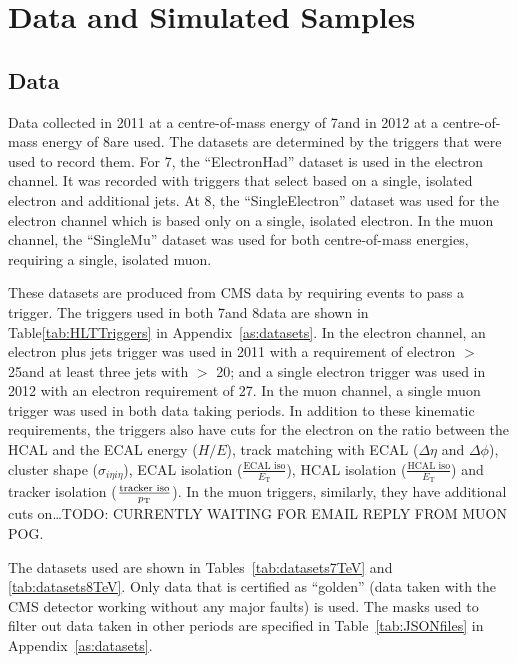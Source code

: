 \section{Data and Simulated Samples}
\label{s:data_and_simulated_samples}

\subsection{Data}
\label{ss:data}

Data collected in 2011 at a centre-of-mass energy of 7\TeV and in 2012 at a centre-of-mass energy of 8\TeV are
used. The datasets are determined by the triggers that were used to record them. For 7\TeV, the ``ElectronHad''
dataset is used in the electron channel. It was recorded with triggers that select based on a single, isolated
electron and additional jets. At 8\TeV, the ``SingleElectron'' dataset was used for the electron channel which is
based only on a single, isolated electron. In the muon channel, the ``SingleMu'' dataset was used for both
centre-of-mass energies, requiring a single, isolated muon.

These datasets are produced from CMS data by requiring events to pass a trigger. The triggers used in both
7\TeV and 8\TeV data are shown in Table\ref{tab:HLTTriggers} in Appendix~\ref{as:datasets}. In the electron
channel, an electron plus jets trigger was used in 2011 with a requirement of electron \Et $>$ 25\GeV and at
least three jets with \pt $>$ 20\GeV; and a single electron trigger was used in 2012 with an electron \Et
requirement of 27\GeV. In the muon channel, a single muon trigger was used in both data taking periods. In
addition to these kinematic requirements, the triggers also have cuts for the electron on the ratio between
the HCAL and the ECAL energy ($H/E$), track matching with ECAL ($\Delta\eta$ and $\Delta\phi$), cluster shape
($\sigma_{i\eta i\eta}$), ECAL isolation ($\frac{\text{ECAL iso}}{E_\text{T}}$), HCAL isolation
($\frac{\text{HCAL iso}}{E_\text{T}}$) and tracker isolation ($\frac{\text{tracker iso}}{p_{\mathrm{T}}}$). In the muon
triggers, similarly, they have additional cuts on\ldots TODO: CURRENTLY WAITING FOR EMAIL REPLY FROM MUON POG.

The datasets used are shown in Tables~\ref{tab:datasets7TeV} and \ref{tab:datasets8TeV}. %
Only data that is certified as ``golden'' (data taken with the CMS detector
working without any major faults) is used. The masks used to filter out data taken in other periods are
specified in Table~\ref{tab:JSONfiles} in Appendix~\ref{as:datasets}.

